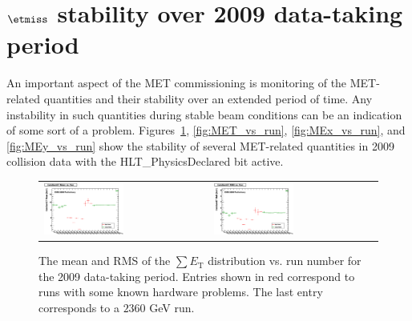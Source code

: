 \section{$\etmiss$ stability over 2009 data-taking period}
\label{sc:METStab}

An important aspect of the MET commissioning is monitoring of the MET-related quantities and their stability over
an extended period of time. Any instability in such quantities during stable beam conditions can be an indication of some sort of a problem. Figures~\ref{fig:SumET_vs_run}, \ref{fig:MET_vs_run}, \ref{fig:MEx_vs_run}, and \ref{fig:MEy_vs_run} show the stability of several MET-related quantities in 2009 collision data with the HLT\_PhysicsDeclared bit active.

\begin{figure}[h!]
 \centering
 \begin{tabular}{ll}
  \includegraphics[width=0.5\textwidth]{plots_METStability/h_caloSumetMean_vs_run.eps} &
  \includegraphics[width=0.5\textwidth]{plots_METStability/h_caloSumetRMS_vs_run.eps} \\
 \end{tabular}
 \caption{\small The mean and RMS of the $\sum E_\text{T}$ distribution vs. run number for the 2009 data-taking period.
          Entries shown in red correspond to runs with some known hardware problems. The last entry corresponds to a $2360$ GeV run.
          \label{fig:SumET_vs_run}}
\end{figure}

